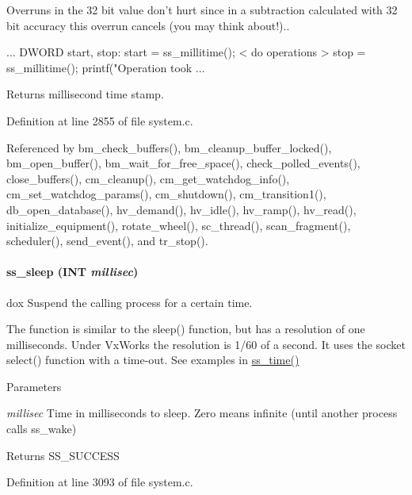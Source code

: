 Overruns in the 32 bit value don't hurt since in a subtraction calculated with 32 bit accuracy this overrun cancels (you may think about!).. 
\begin{DoxyCode}
...
DWORD start, stop:
start = ss_millitime();
  < do operations >
stop = ss_millitime();
printf("Operation took %
...
\end{DoxyCode}
 \begin{DoxyReturn}{Returns}
millisecond time stamp. 
\end{DoxyReturn}


Definition at line 2855 of file system.c.

Referenced by bm\_\-check\_\-buffers(), bm\_\-cleanup\_\-buffer\_\-locked(), bm\_\-open\_\-buffer(), bm\_\-wait\_\-for\_\-free\_\-space(), check\_\-polled\_\-events(), close\_\-buffers(), cm\_\-cleanup(), cm\_\-get\_\-watchdog\_\-info(), cm\_\-set\_\-watchdog\_\-params(), cm\_\-shutdown(), cm\_\-transition1(), db\_\-open\_\-database(), hv\_\-demand(), hv\_\-idle(), hv\_\-ramp(), hv\_\-read(), initialize\_\-equipment(), rotate\_\-wheel(), sc\_\-thread(), scan\_\-fragment(), scheduler(), send\_\-event(), and tr\_\-stop().
\paragraph[{ss\_\-sleep}]{ ss\_\-sleep ({\bf INT} {\em millisec})}\hfill\label{group__msfunctionc_gaf877acb3de6be606dd427a84aa7b6dda}
dox Suspend the calling process for a certain time.

The function is similar to the sleep() function, but has a resolution of one milliseconds. Under VxWorks the resolution is 1/60 of a second. It uses the socket select() function with a time-\/out. See examples in \hyperlink{group__msfunctionc_gab7852119bd4dc1e08aa03127d8ca008b}{ss\_\-time()} 
\begin{DoxyParams}{Parameters}
\item[{\em millisec}]Time in milliseconds to sleep. Zero means infinite (until another process calls ss\_\-wake) \end{DoxyParams}
\begin{DoxyReturn}{Returns}
SS\_\-SUCCESS 
\end{DoxyReturn}


Definition at line 3093 of file system.c.

